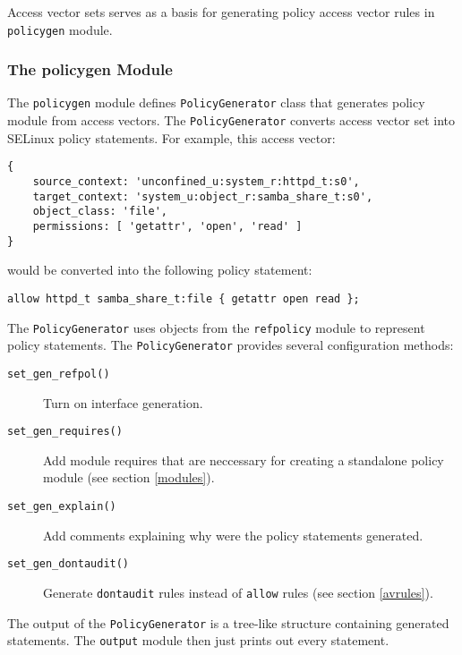Access vector sets serves as a basis for generating policy access vector rules
in \texttt{policygen} module.

\subsubsection{The policygen Module}

The \texttt{policygen} module defines \texttt{PolicyGenerator} class that
generates policy module from access vectors. The \texttt{PolicyGenerator}
converts access vector set into SELinux policy statements. For example, this
access vector:
\begin{lstlisting}
{
    source_context: 'unconfined_u:system_r:httpd_t:s0',
    target_context: 'system_u:object_r:samba_share_t:s0',
    object_class: 'file',
    permissions: [ 'getattr', 'open', 'read' ]
}
\end{lstlisting}
would be converted into the following policy statement:
\begin{lstlisting}
allow httpd_t samba_share_t:file { getattr open read };
\end{lstlisting}

The \texttt{PolicyGenerator} uses objects from the \texttt{refpolicy} module to
represent policy statements. The \texttt{PolicyGenerator} provides several
configuration methods:
\begin{description}
    \item [\texttt{set\_gen\_refpol()}] Turn on interface generation.
    \item [\texttt{set\_gen\_requires()}] Add module requires that are
        neccessary for creating a standalone policy module (see section
        \ref{modules}).
    \item [\texttt{set\_gen\_explain()}] Add comments explaining why were the
        policy statements generated.
    \item [\texttt{set\_gen\_dontaudit()}] Generate \texttt{dontaudit} rules
        instead of \texttt{allow} rules (see section \ref{avrules}).
\end{description}
The output of the \texttt{PolicyGenerator} is a tree-like structure containing
generated statements. The \texttt{output} module then just prints out every
statement.

